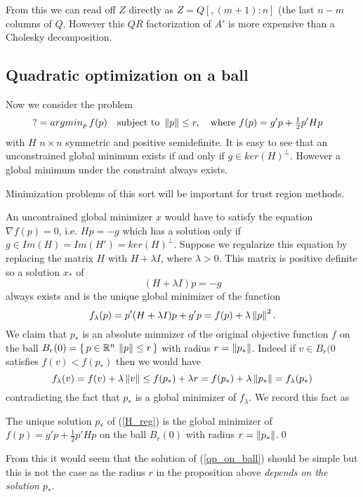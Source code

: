 From this we can read off $Z$ directly as $Z=Q[,(m+1):n]$ (the last $n-m$ 
columns of $Q$. However this $QR$ factorization of $A'$ is more expensive than
a Cholesky decomposition.
 

\subsection{Quadratic optimization on a ball}
\label{subsec:QP_on_ball}

Now we consider the problem
%
\begin{align}
\label{qp_on_ball}
? &= argmin_p\thinspace f(p)\quad\text{subject to }
\left\|p\right\|\leq r,\quad\text{where }
f(p) = g'p+\tfrac{1}{2}p'Hp
\end{align}  
%
with $H$ $n\times n$ symmetric and positive semidefinite. It is easy to see that
an unconstrained global minimum exists if and only if $g\in ker(H)^\perp$. 
However a global minimum under the constraint always exists.

\noindent
Minimization problems of this sort will be important for trust region methods.

An uncontrained global minimizer $x$ would have to satisfy the equation 
$\nabla f(p)=0$, i.e. $Hp=-g$ which has a solution only if 
$g\in Im(H)=Im(H')=ker(H)^\perp$. Suppose we regularize this equation by replacing
the matrix $H$ with $H+\lambda I$, where $\lambda>0$. This matrix is positive
definite so a solution $x_*$ of 
%
\begin{equation}
\label{H_reg}
(H+\lambda I)p=-g
\end{equation}
% 
always exists and is the unique global minimizer of the function
$$
f_\lambda(p)=p'(H+\lambda I)p+g'p=f(p)+\lambda\left\|p\right\|^2.
$$
We claim that $p_*$ is an absolute minmizer of the original objective function 
$f$ on the ball $B_r(0)=\{\thinspace p\in{\mathbb R}^n\thinspace\left\|p\right\|\leq r\thinspace\}$ with radius
$r=\left\|p_*\right\|$. Indeed if $v\in B_r(0$ satisfies $f(v)<f(p_*)$ then we would have
$$
f_\lambda(v)=
f(v)+\lambda\left\|v\right\|\leq 
f(p_*)+\lambda r=
f(p_*)+\lambda\left\|p_*\right\|=f_\lambda(p_*)
$$
contradicting the fact that $p_*$ is a global minimizer of $f_\lambda$. We record this fact as
%
\begin{prop}
\label{prop:f_eps_min}
The unique solution $p_*$ of (\ref{H_reg}) is the global minimizer of 
$f(p)=g'p+\tfrac{1}{2}p'Hp$ on the ball $B_r(0)$ with radius $r=\left\|p_*\right\|$.\qed 
\end{prop}
%
From this it would seem that the solution of (\ref{qp_on_ball}) should be simple
but this is not the case as the radius $r$ in the proposition above 
\textit{depends on the solution} $p_*$.

